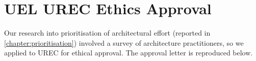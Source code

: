 \chapter {UEL UREC Ethics Approval}

Our research into prioritisation of architectural effort (reported in \cref{chapter:prioritisation}) involved a survey of architecture practitioners, so we applied to UREC for ethical approval.  The approval letter is reproduced below.

